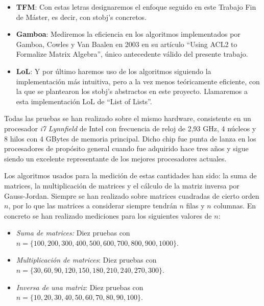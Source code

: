 \documentclass[a4paper,10pt]{article}
\begin{document}
\begin{itemize}
	\item \textbf{TFM}: Con estas letras designaremos el enfoque seguido en este Trabajo Fin de Máster, es decir, con stobj's concretos.
	\item \textbf{Gamboa}: Mediremos la eficiencia en los algoritmos implementados por Gamboa, Cowles y Van Baalen en 2003 en su artículo ``Using ACL2 to Formalize Matrix Algebra'', único antecedente válido del presente trabajo.
	\item \textbf{LoL}: Y por último haremos uso de los algoritmos siguiendo la implementación más intuitiva, pero a la vez menos teóricamente eficiente, con la que se plantearon los stobj's abstractos en este proyecto. Llamaremos a esta implementación LoL de ``List of Lists''.
	\end{itemize}

\par \vspace{10pt}

Todas las pruebas se han realizado sobre el mismo hardware, consistente en un procesador \emph{i7}\textsuperscript{\texttrademark} \emph{Lynnfield} de Intel\textsuperscript{\textregistered} con frecuencia de reloj de 2,93 GHz, 4 núcleos y 8 hilos con 4 GBytes de memoria principal. Dicho chip fue punta de lanza en los procesadores de propósito general cuando fue adquirido hace tres años y sigue siendo un excelente representante de los mejores procesadores actuales.

\par \vspace{10pt}

Los algoritmos usados para la medición de estas cantidades han sido: la suma de matrices, la multiplicación de matrices y el cálculo de la matriz inversa por Gauss-Jordan. Siempre se han realizado sobre matrices cuadradas de cierto orden $n$, por lo que las matrices a considerar siempre tendrán $n$ filas y $n$ columnas. En concreto se han realizado mediciones para los siguientes valores de $n$:
 
\par \vspace{10pt}

\begin{itemize}
	\item \emph{Suma de matrices:} Diez pruebas con $n=\{100,200,300,400,500,600,700,800,900,1000\}$.
	\item \emph{Multiplicación de matrices}: Diez pruebas con $n=\{30,60,90,120,150,180,210,240,270,300\}$.
	\item \emph{Inversa de una matriz}: Diez pruebas con $n=\{10,20,30,40,50,60,70,80,90,100\}$.
\end{itemize}
\end{document}
